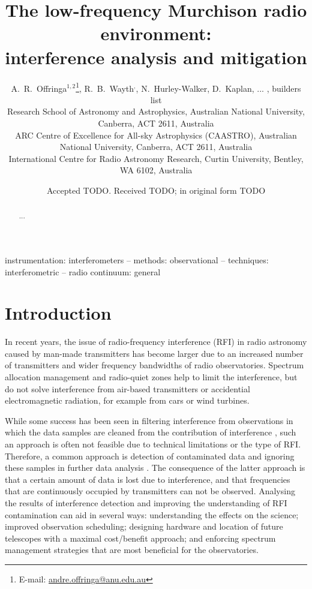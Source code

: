 \documentclass[useAMS,usenatbib]{mn2e}
\title[The Murchison radio environment]{The low-frequency Murchison radio environment:\\interference analysis and mitigation}
\author[A.~R.~Offringa et al.]{A.~R.~Offringa$^{1,2}$\thanks{\editmark{Corresponding author.} E-mail: \url{andre.offringa@anu.edu.au}},
R.~B.~Wayth\Curtin$^,$\CAASTRO,
N.~Hurley-Walker\Curtin,
D.~Kaplan\Curtin,
... , %
builders list
\\
\ANU{}Research School of Astronomy and Astrophysics, Australian National University, Canberra, ACT 2611, Australia \\
\CAASTRO{}ARC Centre of Excellence for All-sky Astrophysics (CAASTRO), Australian National University, Canberra, ACT 2611, Australia \\
\Curtin{}International Centre for Radio Astronomy Research, Curtin University, Bentley, WA 6102, Australia\\
}
\begin{document}
\date{Accepted TODO. Received TODO; in original form TODO}
\pagerange{\pageref{firstpage}--\pageref{lastpage}}

\label{firstpage}
\maketitle

\begin{abstract}
...
\end{abstract}

\begin{keywords}
instrumentation: interferometers -- methods: observational -- techniques: interferometric -- radio continuum: general
\end{keywords}

\section{Introduction}
In recent years, the issue of radio-frequency interference (RFI) in radio astronomy caused by man-made transmitters has become larger due to an increased number of transmitters and wider frequency bandwidths of radio observatories. Spectrum allocation management and radio-quiet zones help to limit the interference, but do not solve interference from air-based transmitters or accidential electromagnetic radiation, for example from cars or wind turbines.

While some success has been seen in filtering interference from observations in which the data samples are cleaned from the contribution of interference \citep{spatial-filtering-parkes-multibeam-for-pulses,rfi-spatial-processing-hellbourg-2014}, such an approach is often not feasible due to technical limitations or the type of RFI. Therefore, a common approach is detection of contaminated data and ignoring these samples in further data analysis \citep{post-correlation-rfi-classification}. The consequence of the latter approach is that a certain amount of data is lost due to interference, and that frequencies that are continuously occupied by transmitters can not be observed. Analysing the results of interference detection and improving the understanding of RFI contamination can aid in several ways: understanding the effects on the science; improved observation scheduling; designing hardware and location of future telescopes with a maximal cost/benefit approach; and enforcing spectrum management strategies that are most beneficial for the observatories.
\end{document}
